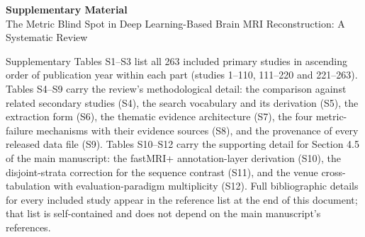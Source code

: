 \documentclass[11pt]{article}
\renewcommand{\thetable}{S\arabic{table}}
\begin{document}
\begin{center}

{\Large\bfseries Supplementary Material}\\[4pt]

{\large The Metric Blind Spot in Deep Learning-Based Brain MRI Reconstruction: A Systematic Review}

\end{center}

\vspace{8pt}

\noindent Supplementary Tables S1--S3 list all 263 included primary studies in ascending order of publication year within each part (studies 1--110, 111--220 and 221--263). Tables S4--S9 carry the review's methodological detail: the comparison against related secondary studies (S4), the search vocabulary and its derivation (S5), the extraction form (S6), the thematic evidence architecture (S7), the four metric-failure mechanisms with their evidence sources (S8), and the provenance of every released data file (S9). Tables S10--S12 carry the supporting detail for Section 4.5 of the main manuscript: the fastMRI+ annotation-layer derivation (S10), the disjoint-strata correction for the sequence contrast (S11), and the venue cross-tabulation with evaluation-paradigm multiplicity (S12). Full bibliographic details for every included study appear in the reference list at the end of this document; that list is self-contained and does not depend on the main manuscript's references.

\vspace{8pt}

\clearpage

\clearpage
\setcounter{table}{0}
\renewcommand{\thetable}{S\arabic{table}}
\end{document}
